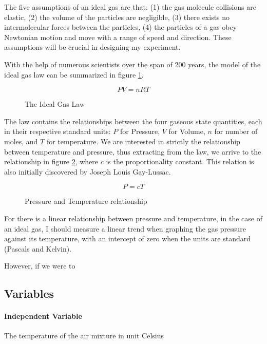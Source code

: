 \documentclass[a4paper,12pt]{article}
\begin{document}
The five assumptions of an ideal gas are that: (1) the gas molecule collisions are elastic, (2) the volume of the particles are negligible, (3) there exists no intermolecular forces between the particles, (4) the particles of a gas obey Newtonian motion and move with a range of speed and direction. These assumptions will be crucial in designing my experiment.

With the help of numerous scientists over the span of 200 years, the model of the ideal gas law can be summarized in figure \ref{fig:igl}.

\begin{figure}[H]
    \[
    PV = nRT
    \]
    \caption{The Ideal Gas Law}
    \label{fig:igl}
\end{figure}

The law contains the relationships between the four gaseous state quantities, each in their respective standard units: $P$ for Pressure, $V$ for Volume, $n$ for number of moles, and $T$ for temperature. We are interested in strictly the relationship between temperature and pressure, thus extracting from the law, we arrive to the relationship in figure \ref{fig:pt}, where $c$ is the proportionality constant. This relation is also initially discovered by Joseph Louis Gay-Lussac.

\begin{figure}[H]
    \[
    P = cT
    \]
    \caption{Pressure and Temperature relationship}
    \label{fig:pt}
\end{figure}

For there is a linear relationship between pressure and temperature, in the case of an ideal gas, I should measure a linear trend when graphing the gas pressure against its temperature, with an intercept of zero when the units are standard (Pascals and Kelvin).


However, if we were to







\subsection{Variables}
\paragraph{Independent Variable}
The temperature of the air mixture in unit Celsius
\end{document}
